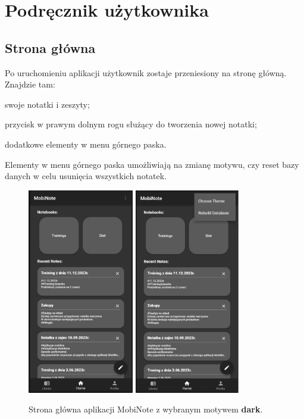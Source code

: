 \chapter{Podręcznik użytkownika}
\label{ch:manual}

\section{Strona główna}

Po uruchomieniu aplikacji użytkownik zostaje przeniesiony na stronę główną. Znajdzie tam:
\begin{compactitem}
    \item swoje notatki i zeszyty;
    \item przycisk w prawym dolnym rogu służący do tworzenia nowej notatki;
    \item dodatkowe elementy w menu górnego paska.
\end{compactitem}
Elementy w menu górnego paska umożliwiają na zmianę motywu, czy reset bazy danych w celu usunięcia wszystkich notatek. 

\begin{figure}[ht]
    \centering
    \includegraphics[height=9cm]{images/strona_domowa.png}
    \quad\quad
    \includegraphics[height=9cm]{images/strona_domowa_opcje.png}
    \caption{Strona główna aplikacji MobiNote z wybranym motywem \textbf{dark}.}
\end{figure}

